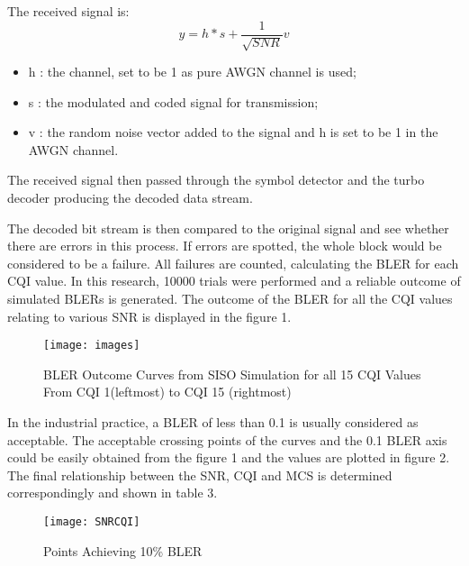 \documentclass[journal,comsoc]{IEEEtran}
\begin{document}
The received signal is:
\[y=h*s+\frac{1}{\sqrt{SNR}}v \]

\begin{itemize}
  \item h : the channel, set to be 1 as pure AWGN channel is used;
  \item s : the modulated and coded signal for transmission;
  \item v : the random noise vector added to the signal and h is set to be 1 in the AWGN channel.
\end{itemize}
The received signal then passed through the symbol detector and the turbo decoder producing the decoded data stream.

The decoded bit stream is then compared to the original signal and see whether there are errors in this process. If errors are spotted, the whole block would be considered to be a failure. All failures are counted, calculating the BLER for each CQI value. In this research, 10000 trials were performed and a reliable outcome of simulated BLERs is generated. The outcome of the BLER for all the CQI values relating to various SNR is displayed in the figure 1.
\begin{figure}[!h]
    \centering
    \captionsetup{justification=centering}
    \label{fig_parabola}
	\texttt{[image: images]}
	\centering
	\caption{BLER Outcome Curves from SISO Simulation for all 15 CQI Values
From CQI 1(leftmost) to CQI 15 (rightmost)}
\end{figure}

In the industrial practice, a BLER of less than 0.1 is usually considered as acceptable. The acceptable crossing points of the curves and the 0.1 BLER axis could be easily obtained from the figure 1 and the values are plotted in figure 2. The final relationship between the SNR, CQI and MCS is determined correspondingly and shown in table 3.
\begin{figure}[!h]
    \centering
    \captionsetup{justification=centering}
    \label{fig_parabola}
	\texttt{[image: SNRCQI]}
	\centering
	\caption{Points Achieving 10\% BLER}
\end{figure}
\end{document}
